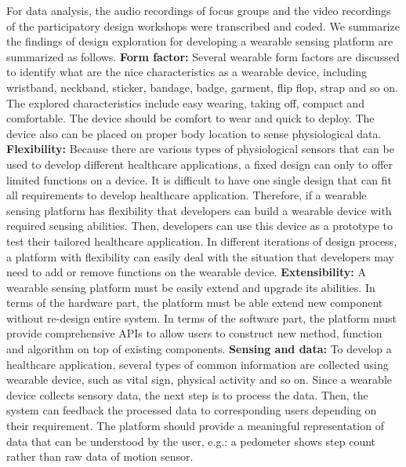 For data analysis, the audio recordings of focus groups and the video recordings of the participatory design workshops were transcribed and coded. We summarize the findings of design exploration for developing a wearable sensing platform are summarized as follows.
\vspace{15pt}
\newline
\textbf{Form factor:}\newline
Several wearable form factors are discussed to identify what are the nice characteristics as a wearable device, including wristband, neckband, sticker, bandage, badge, garment, flip flop, strap and so on. The explored characteristics include easy wearing, taking off, compact and comfortable. The device should be comfort to wear and quick to deploy. The device also can be placed on proper body location to sense physiological data.
\vspace{10pt}
\newline
\textbf{Flexibility:}\newline
Because there are various types of physiological sensors that can be used to develop different healthcare applications, a fixed design can only to offer limited functions on a device. It is difficult to have one single design that can fit all requirements to develop healthcare application. Therefore, if a wearable sensing platform has flexibility that developers can build a wearable device with required sensing abilities. Then, developers can use this device as a prototype to test their tailored healthcare application. In different iterations of design process, a platform with flexibility can easily deal with the situation that developers may need to add or remove functions on the wearable device.
\vspace{10pt}
\newline
\textbf{Extensibility:}\newline
A wearable sensing platform must be easily extend and upgrade its abilities. In terms of the hardware part, the platform must be able extend new component without re-design entire system. In terms of the software part, the platform must provide comprehensive APIs to allow users to construct new method, function and algorithm on top of existing components.
\vspace{10pt}
\newline
\textbf{Sensing and data:}\newline
To develop a healthcare application, several types of common information are collected using wearable device, such as vital sign, physical activity and so on. Since a wearable device collects sensory data, the next step is to process the data. Then, the system can feedback the processed data to corresponding users depending on their requirement. The platform should provide a meaningful representation of data that can be understood by the user, e.g.: a pedometer shows step count rather than raw data of motion sensor.

